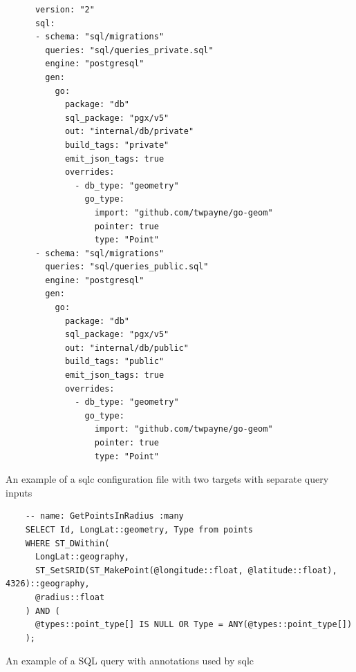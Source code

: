 \begin{listing}[htbp]
  \centering{}
  \begin{minipage}{0.75\textwidth}
  \begin{verbatim}
      version: "2"
      sql:
      - schema: "sql/migrations"
        queries: "sql/queries_private.sql"
        engine: "postgresql"
        gen:
          go:
            package: "db"
            sql_package: "pgx/v5"
            out: "internal/db/private"
            build_tags: "private"
            emit_json_tags: true
            overrides:
              - db_type: "geometry"
                go_type:
                  import: "github.com/twpayne/go-geom"
                  pointer: true
                  type: "Point"
      - schema: "sql/migrations"
        queries: "sql/queries_public.sql"
        engine: "postgresql"
        gen:
          go:
            package: "db"
            sql_package: "pgx/v5"
            out: "internal/db/public"
            build_tags: "public"
            emit_json_tags: true
            overrides:
              - db_type: "geometry"
                go_type:
                  import: "github.com/twpayne/go-geom"
                  pointer: true
                  type: "Point"
  \end{verbatim}
  \end{minipage}
  \caption{An example of a sqlc configuration file with two targets with separate query inputs}
  \label{listing:sqlc_config_file}
\end{listing}

\begin{listing}[htbp]
  \centering{}
  \begin{minipage}{\textwidth}
  \begin{verbatim}
    -- name: GetPointsInRadius :many
    SELECT Id, LongLat::geometry, Type from points
    WHERE ST_DWithin(
      LongLat::geography,
      ST_SetSRID(ST_MakePoint(@longitude::float, @latitude::float), 4326)::geography,
      @radius::float
    ) AND (
      @types::point_type[] IS NULL OR Type = ANY(@types::point_type[])
    );
  \end{verbatim}
  \end{minipage}
  \caption{An example of a SQL query with annotations used by sqlc}
  \label{listing:sqlc_query_input}
\end{listing}


